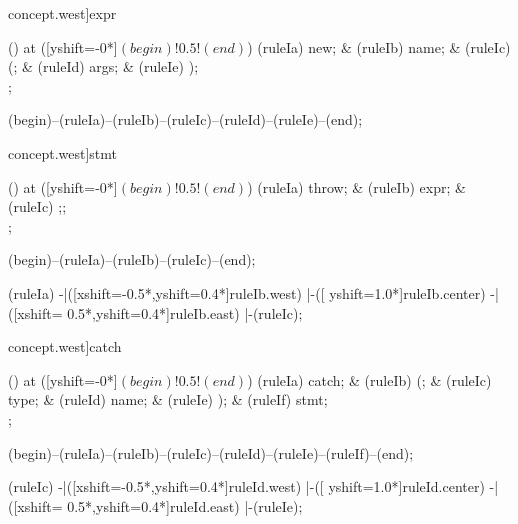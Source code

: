 \begin{syntax}[[xshift=18mm]concept.west]{expr}
  
  \node[sequence,column sep=1.1cm] () at ([yshift=-0*\syntaxruledist]$(begin)!0.5!(end)$) {
    \node[terminal]    (ruleIa) {new};
    &
    \node[nonterminal] (ruleIb) {name};
    &
    \node[terminal]    (ruleIc) {(};
    &
    \node[nonterminal] (ruleId) {args};
    &
    \node[terminal]    (ruleIe) {)};
    \\
  };
  
  \draw[path] (begin)--(ruleIa)--(ruleIb)--(ruleIc)--(ruleId)--(ruleIe)--(end);
\end{syntax}

\begin{syntax}[[xshift=18mm]concept.west]{stmt}
  
  \node[sequence,column sep=2.0cm] () at ([yshift=-0*\syntaxruledist]$(begin)!0.5!(end)$) {
    \node[terminal]    (ruleIa) {throw};
    &
    \node[nonterminal] (ruleIb) {expr};
    &
    \node[terminal]    (ruleIc) {;};
    \\
  };
  
  \draw[path] (begin)--(ruleIa)--(ruleIb)--(ruleIc)--(end);
  
  \draw[path] (ruleIa)
            -|([xshift=-0.5*\syntaxruledist,yshift=0.4*\syntaxruledist]ruleIb.west)
            |-([                             yshift=1.0*\syntaxruledist]ruleIb.center)
            -|([xshift= 0.5*\syntaxruledist,yshift=0.4*\syntaxruledist]ruleIb.east)
            |-(ruleIc);
\end{syntax}

\begin{syntax}[[xshift=18mm]concept.west]{catch}
  
  \node[sequence,column sep=1.1cm] () at ([yshift=-0*\syntaxruledist]$(begin)!0.5!(end)$) {
    \node[terminal]    (ruleIa) {catch};
    &
    \node[terminal]    (ruleIb) {(};
    &
    \node[nonterminal] (ruleIc) {type};
    &
    \node[nonterminal] (ruleId) {name};
    &
    \node[terminal]    (ruleIe) {)};
    &
    \node[nonterminal] (ruleIf) {stmt};
    \\
  };
  
  \draw[path] (begin)--(ruleIa)--(ruleIb)--(ruleIc)--(ruleId)--(ruleIe)--(ruleIf)--(end);
  
  \draw[path] (ruleIc)
            -|([xshift=-0.5*\syntaxruledist,yshift=0.4*\syntaxruledist]ruleId.west)
            |-([                             yshift=1.0*\syntaxruledist]ruleId.center)
            -|([xshift= 0.5*\syntaxruledist,yshift=0.4*\syntaxruledist]ruleId.east)
            |-(ruleIe);
\end{syntax}

